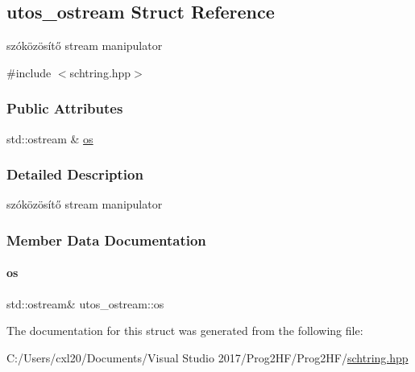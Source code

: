 \subsection{utos\+\_\+ostream Struct Reference}
\label{structutos__ostream}


szóközösítő stream manipulator  




{\ttfamily \#include $<$schtring.\+hpp$>$}

\subsubsection*{Public Attributes}
\begin{DoxyCompactItemize}
\item 
std\+::ostream \& \mbox{\hyperlink{structutos__ostream_aec8d0c25d29aa2cea8ade1cfb60fb3ef}{os}}
\end{DoxyCompactItemize}


\subsubsection{Detailed Description}
szóközösítő stream manipulator 

\subsubsection{Member Data Documentation}
\mbox{\label{structutos__ostream_aec8d0c25d29aa2cea8ade1cfb60fb3ef}} 
\paragraph{\texorpdfstring{os}{os}}
{\footnotesize\ttfamily std\+::ostream\& utos\+\_\+ostream\+::os}



The documentation for this struct was generated from the following file\+:\begin{DoxyCompactItemize}
\item 
C\+:/\+Users/cxl20/\+Documents/\+Visual Studio 2017/\+Prog2\+H\+F/\+Prog2\+H\+F/\mbox{\hyperlink{schtring_8hpp}{schtring.\+hpp}}\end{DoxyCompactItemize}

